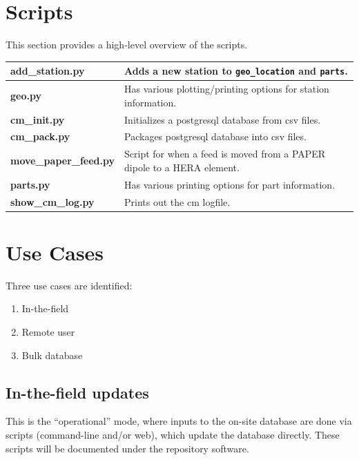 \documentclass{article}
\begin{document}
\section{Scripts}
This section provides a high-level overview of the scripts.  
\vspace{0.5cm}

\begin{tabular}{l p{12cm}}
{\bf add\_station.py} & Adds a new station to {\tt geo\_location} and {\tt parts}.\\ \hline
{\bf geo.py} & Has various plotting/printing options for station information. \\ \hline
{\bf cm\_init.py} & Initializes a postgresql database from csv files. \\ \hline
{\bf cm\_pack.py} & Packages postgresql database into csv files. \\ \hline
{\bf move\_paper\_feed.py} & Script for when a feed is moved from a PAPER dipole to a HERA element. \\ \hline
{\bf parts.py} & Has various printing options for part information. \\ \hline
{\bf show\_cm\_log.py} & Prints out the cm logfile. \\
\end{tabular}

\section{Use Cases}
Three use cases are identified:
\begin{enumerate}\setlength\itemsep{-.3em}
	\item In-the-field
	\item Remote user
	\item Bulk database
\end{enumerate}

\subsection{In-the-field updates}
This is the ``operational'' mode, where inputs to the on-site database are done via scripts (command-line and/or web), which update the database directly.  These scripts will be documented under the repository software.
\end{document}
